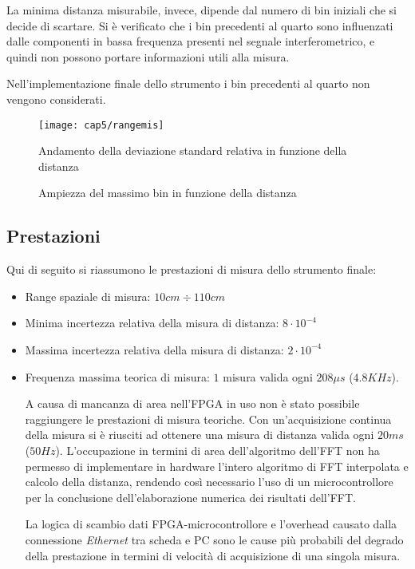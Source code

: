 La minima distanza misurabile, invece, dipende dal numero di bin iniziali che si decide di scartare. Si è verificato che i bin precedenti al quarto sono influenzati dalle componenti in bassa frequenza presenti nel segnale interferometrico, e quindi non possono portare informazioni utili alla misura.

Nell'implementazione finale dello strumento i bin precedenti al quarto non vengono considerati.
\begin{figure}[H]
	\begin{center}
		\texttt{[image: cap5/rangemis]}
		\caption{Andamento della deviazione standard relativa in funzione della distanza}
		\label{rangemis}
	\end{center}
\end{figure}
\begin{figure}[H]
	\centering
\end{figure}
\begin{figure}[H]
	\centering
	\caption{Ampiezza del massimo bin in funzione della distanza}\label{ampbin}
\end{figure}

\subsection{Prestazioni}
Qui di seguito si riassumono le prestazioni di misura dello strumento finale:
\begin{itemize}
	\item Range spaziale di misura: $10cm \div 110cm$
	\item Minima incertezza relativa della misura di distanza: $8 \cdot 10^{-4}$
	\item Massima incertezza relativa della misura di distanza: $2 \cdot 10^{-4}$
	\item Frequenza massima teorica di misura: $1$ misura valida ogni $208 \mu s$ ($4.8 KHz$).
	
	A causa di mancanza di area nell'FPGA in uso non è stato possibile raggiungere le prestazioni di misura teoriche. Con un'acquisizione continua della misura si è riusciti ad ottenere una misura di distanza valida ogni $20 ms$ ($50 Hz$). L'occupazione in termini di area dell'algoritmo dell'FFT non ha permesso di implementare in hardware l'intero algoritmo di FFT interpolata e calcolo della distanza, rendendo così necessario l'uso di un microcontrollore per la conclusione dell'elaborazione numerica dei risultati dell'FFT.
	
	La logica di scambio dati FPGA-microcontrollore e l'overhead causato dalla connessione \textit{Ethernet} tra scheda e PC sono le cause più probabili del degrado della prestazione in termini di velocità di acquisizione di una singola misura.
\end{itemize}

